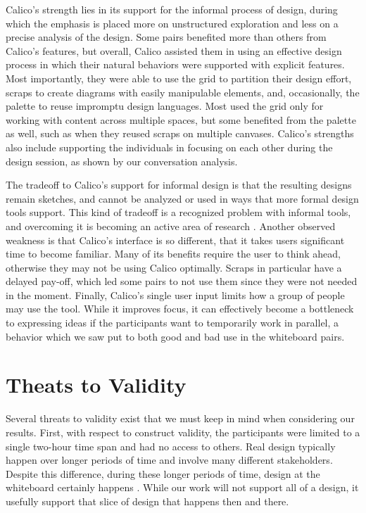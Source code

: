 Calico's strength lies in its support for the informal process of design, during which the emphasis is placed more on unstructured exploration and less on a precise analysis of the design. Some pairs benefited more than others from Calico's features, but overall, Calico assisted them in using an effective design process in which their natural behaviors were supported with explicit features. Most importantly, they were able to use the grid to partition their design effort, scraps to create diagrams with easily manipulable elements, and, occasionally, the palette to reuse impromptu design languages.  Most used the grid only for working with content across multiple spaces, but some benefited from the palette as well, such as when they reused scraps on multiple canvases. Calico's strengths also include supporting the individuals in focusing on each other during the design session, as shown by our conversation analysis. 

The tradeoff to Calico's support for informal design is that the resulting designs remain sketches, and cannot be analyzed or used in ways that more formal design tools support. This kind of tradeoff is a recognized problem with informal tools, and overcoming it is becoming an active area of research \citep{Ossher2}. Another observed weakness is that Calico's interface is so different, that it takes users significant time to become familiar. Many of its benefits require the user to think ahead, otherwise they may not be using Calico optimally. Scraps in particular have a delayed pay-off, which led some pairs to not use them since they were not needed in the moment. Finally, Calico's single user input limits how a group of people may use the tool. While it improves focus, it can effectively become a bottleneck to expressing ideas if the participants want to temporarily work in parallel, a behavior which we saw put to both good and bad use in the whiteboard pairs.

\section{Theats to Validity}
\label{threatstovalidity}

Several threats to validity exist that we must keep in mind when considering our results. First, with respect to construct  validity, the participants were limited to a single two-hour time span and had no access to others. Real design typically  happen over longer periods of time and involve many different stakeholders. Despite this difference, during these longer periods of time, design at the whiteboard certainly happens \citep{cherubini2007let}. While our work will not support all of a design, it usefully support that slice of design that happens then and there.

